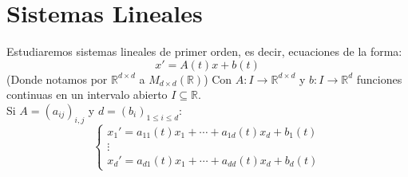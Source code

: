 \newpage
\chapter{Sistemas Lineales}
\noindent
Estudiaremos sistemas lineales de primer orden, es decir, ecuaciones de la forma:
\begin{equation*}
    x' = A(t) x + b(t)
\end{equation*}
(Donde notamos por $\mathbb{R}^{d\times d}$ a $M_{d\times d}(\mathbb{R})$)
Con $A:I\rightarrow\mathbb{R}^{d\times d}$ y $b:I\rightarrow\mathbb{R}^d$ funciones continuas en un intervalo abierto $I\subseteq \mathbb{R}$.\\


Si $A = {(a_{ij})}_{i,j}$ y $d = {(b_i)}_{1\leq i \leq d}$:
\begin{equation*}
    \left\{\begin{array}{c}
        x_1' = a_{11}(t)x_1 + \cdots + a_{1d}(t)x_d + b_1(t) \\
        \vdots \\
        x_d' = a_{d1}(t)x_1 + \cdots + a_{dd}(t)x_d + b_d(t) 
    \end{array}\right.
\end{equation*}

